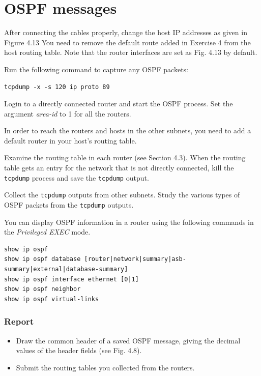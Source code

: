 \documentclass{../UTNetLab}
\begin{document}
\section{OSPF messages}
    After connecting the cables properly, change the host IP addresses as given in Figure 4.13 You need to remove the default route added in Exercise 4 from the host routing table.
    Note that the router interfaces are set as Fig. 4.13 by default. 

    Run the following command to capture any OSPF packets: 
    \begin{lstlisting}
tcpdump -x -s 120 ip proto 89
    \end{lstlisting}

    Login to a directly connected router and start the OSPF process.
    Set the argument \textit{area-id} to 1 for all the routers. 

    In order to reach the routers and hosts in the other subnets, you need to add a default router in your host’s routing table. 

    Examine the routing table in each router (see Section 4.3).
    When the routing table gets an entry for the network that is not directly connected, kill the \lstinline{tcpdump} process and save the \lstinline{tcpdump} output. 

    Collect the \lstinline{tcpdump} outputs from other subnets.
    Study the various types of OSPF packets from the \lstinline{tcpdump} outputs. 

    You can display OSPF information in a router using the following commands in the \textit{Privileged EXEC} mode.
    \begin{lstlisting}[language={cisco}]
show ip ospf
show ip ospf database [router|network|summary|asb-summary|external|database-summary]
show ip ospf interface ethernet [0|1]
show ip ospf neighbor
show ip ospf virtual-links
    \end{lstlisting}
    
    \subsubsection*{Report}
    \begin{itemize}
        \setlength{\itemindent}{0pt}
        \item Draw the common header of a saved OSPF message, giving the decimal values of the header fields (see Fig. 4.8).
        \item Submit the routing tables you collected from the routers.
    \end{itemize}
\end{document}
